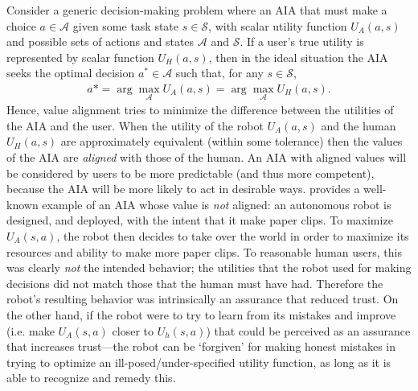 Consider a generic decision-making problem where an AIA that must make a choice $a \in {\mathcal A}$ given some task state $s \in {\mathcal S}$, with scalar utility function $U_A(a,s)$ and possible sets of actions and states ${\mathcal A}$ and ${\mathcal S}$. If a user's true utility is represented by scalar function $U_H(a,s)$, then in the ideal situation the AIA seeks the optimal decision $a^* \in {\mathcal A}$ such that, for any $s \in {\mathcal S}$,
\begin{align*}
    a* = \arg\max_{\mathcal A} U_A(a,s) = \arg \max_{\mathcal A} U_H(a,s). 
\end{align*}
Hence, value alignment tries to minimize the difference between the utilities of the AIA and the user. When the utility of the robot $U_A(a,s)$ and the human $U_H(a,s)$ are approximately equivalent (within some tolerance) then the values of the AIA are \emph{aligned} with those of the human. An AIA with aligned values will be considered by users to be more predictable (and thus more competent), because the AIA will be more likely to act in desirable ways. 
% 
\citet{Bostrom2014-fz} provides a well-known example of an AIA whose value is \emph{not} aligned: an autonomous robot is designed, and deployed, with the intent that it make paper clips. To maximize $U_A(s,a)$, the robot then decides to take over the world in order to maximize its resources and ability to make more paper clips. To reasonable human users, this was clearly \emph{not} the intended behavior; the utilities that the robot used for making decisions did not match those that the human must have had. Therefore the robot's resulting behavior was intrinsically an assurance that reduced trust. On the other hand, if the robot were to try to learn from its mistakes and improve (i.e. make $U_A(s,a)$ closer to $U_h(s,a)$) that could be perceived as an assurance that increases trust---the robot can be `forgiven' for making honest mistakes in trying to optimize an ill-posed/under-specified utility function, as long as it is able to recognize and remedy this. 

